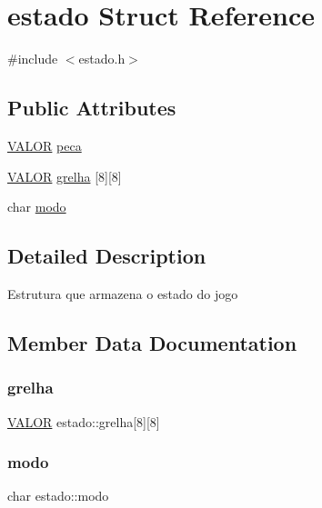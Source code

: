 \hypertarget{structestado}{}\section{estado Struct Reference}
\label{structestado}


{\ttfamily \#include $<$estado.\+h$>$}

\subsection*{Public Attributes}
\begin{DoxyCompactItemize}
\item 
\hyperlink{estado_8h_abfd806e47e2e69b38156c2eab6fda6c0}{V\+A\+L\+OR} \hyperlink{structestado_aa67173516d3e69f71354fb8874af5d64}{peca}
\item 
\hyperlink{estado_8h_abfd806e47e2e69b38156c2eab6fda6c0}{V\+A\+L\+OR} \hyperlink{structestado_a833ca5dab4f610be1c744e6b767920ea}{grelha} \mbox{[}8\mbox{]}\mbox{[}8\mbox{]}
\item 
char \hyperlink{structestado_a09fed37abd7d04094bfdbb5c0c97e9bc}{modo}
\end{DoxyCompactItemize}


\subsection{Detailed Description}
Estrutura que armazena o estado do jogo 

\subsection{Member Data Documentation}
\mbox{\label{structestado_a833ca5dab4f610be1c744e6b767920ea}} 
\subsubsection{\texorpdfstring{grelha}{grelha}}
{\footnotesize\ttfamily \hyperlink{estado_8h_abfd806e47e2e69b38156c2eab6fda6c0}{V\+A\+L\+OR} estado\+::grelha\mbox{[}8\mbox{]}\mbox{[}8\mbox{]}}

\mbox{\label{structestado_a09fed37abd7d04094bfdbb5c0c97e9bc}} 
\subsubsection{\texorpdfstring{modo}{modo}}
{\footnotesize\ttfamily char estado\+::modo}

